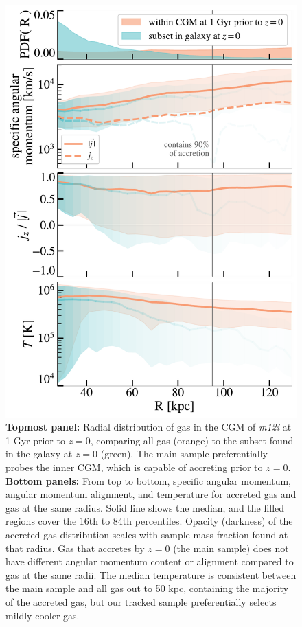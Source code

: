 \documentclass[fleqn,usenatbib]{mnras}
\begin{document}
\begin{figure}
    \centering
    \includegraphics[width=\columnwidth]{figures/selected_to_all_comparison/selected_to_all_comparison_m12i_md.pdf}
    \caption{
    \textbf{Topmost panel:}
    Radial distribution of gas in the CGM of \textit{m12i} at 1 Gyr prior to $z=0$, comparing all gas (orange) to the subset found in the galaxy at $z=0$ (green).
    The main sample preferentially probes the inner CGM, which is capable of accreting prior to $z=0$.
    \textbf{Bottom panels:}
    From top to bottom, specific angular momentum, angular momentum alignment, and temperature for accreted gas and gas at the same radius.
    Solid line shows the median, and the filled regions cover the 16th to 84th percentiles.
    Opacity (darkness) of the accreted gas distribution scales with sample mass fraction found at that radius.
    Gas that accretes by $z=0$ (the main sample) does not have different angular momentum content or alignment compared to gas at the same radii.
    The median temperature is consistent between the main sample and all gas out to 50 kpc, containing the majority of the accreted gas, but our tracked sample preferentially selects mildly cooler gas.
    }
    \label{f: sample validation -- spatial}
\end{figure}
\end{document}
